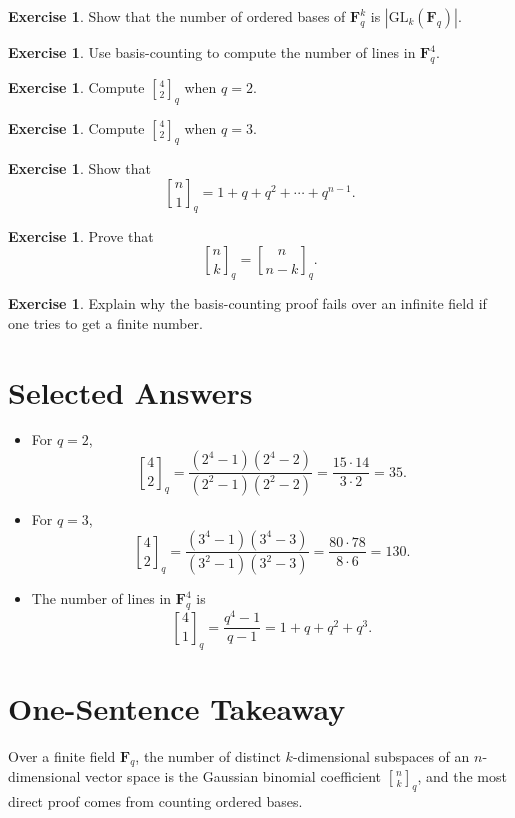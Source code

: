 \documentclass[11pt]{article}
\theoremstyle{definition}
\newtheorem{exercise}[theorem]{Exercise}
\theoremstyle{remark}
\newcommand{\F}{\mathbf{F}}
\newcommand{\GL}{\mathrm{GL}}
\newcommand{\qbinom}[2]{\genfrac{[}{]}{0pt}{}{#1}{#2}_q}
\begin{document}
	\begin{exercise}
		Show that the number of ordered bases of \(\F_q^k\) is \(|\GL_k(\F_q)|\).
	\end{exercise}
	
	\begin{exercise}
		Use basis-counting to compute the number of lines in \(\F_q^4\).
	\end{exercise}
	
	\begin{exercise}
		Compute \(\qbinom{4}{2}\) when \(q=2\).
	\end{exercise}
	
	\begin{exercise}
		Compute \(\qbinom{4}{2}\) when \(q=3\).
	\end{exercise}
	
	\begin{exercise}
		Show that
		\[
		\qbinom{n}{1}=1+q+q^2+\cdots+q^{n-1}.
		\]
	\end{exercise}
	
	\begin{exercise}
		Prove that
		\[
		\qbinom{n}{k}=\qbinom{n}{n-k}.
		\]
	\end{exercise}
	
	\begin{exercise}
		Explain why the basis-counting proof fails over an infinite field if one tries to get a finite number.
	\end{exercise}
	
	\section{Selected Answers}
	
	\begin{itemize}
		\item For \(q=2\),
		\[
		\qbinom{4}{2}
		=
		\frac{(2^4-1)(2^4-2)}{(2^2-1)(2^2-2)}
		=
		\frac{15\cdot 14}{3\cdot 2}
		=
		35.
		\]
		
		\item For \(q=3\),
		\[
		\qbinom{4}{2}
		=
		\frac{(3^4-1)(3^4-3)}{(3^2-1)(3^2-3)}
		=
		\frac{80\cdot 78}{8\cdot 6}
		=
		130.
		\]
		
		\item The number of lines in \(\F_q^4\) is
		\[
		\qbinom{4}{1}
		=
		\frac{q^4-1}{q-1}
		=
		1+q+q^2+q^3.
		\]
	\end{itemize}
	
	\section*{One-Sentence Takeaway}
	
	Over a finite field \(\F_q\), the number of distinct \(k\)-dimensional subspaces of an \(n\)-dimensional vector space is the Gaussian binomial coefficient \(\qbinom{n}{k}\), and the most direct proof comes from counting ordered bases.
	
\end{document}
